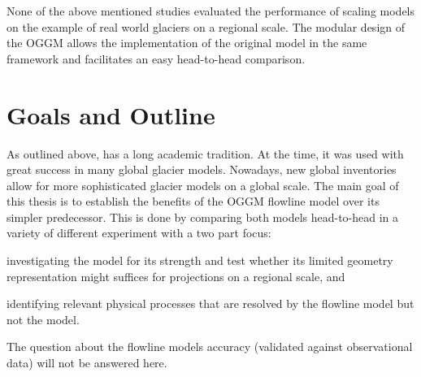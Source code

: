     None of the above mentioned studies evaluated the performance of scaling models on the example of real world glaciers on a regional scale. The modular design of the OGGM allows the implementation of the original \citet{Marzeion2012b} model in the same framework and facilitates an easy head-to-head comparison.



\section{Goals and Outline} %
\label{sec:goals_and_outline}


    As outlined above, \vas{} has a long academic tradition. At the time, it was used with great success in many global glacier models. Nowadays, new global inventories allow for more sophisticated glacier models on a global scale. The main goal of this thesis is to establish the benefits of the OGGM flowline model over its simpler \vas{} predecessor. 
    This is done by comparing both models head-to-head in a variety of different experiment with a two part focus:
    \begin{enumerate*}[label=(\alph*)]
        \item investigating the \vas{} model for its strength and test whether its limited geometry representation might suffices for projections on a regional scale, and
        \item identifying relevant physical processes that are resolved by the flowline model but not the \vas{} model.
    \end{enumerate*}
    The question about the flowline models accuracy (validated against observational data) will not be answered here.
    
